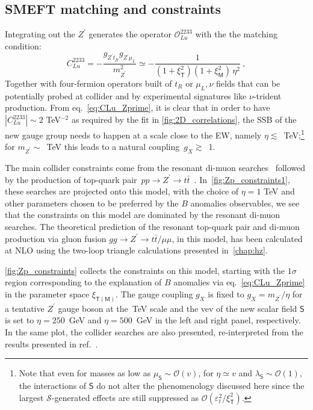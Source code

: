 \subsection{SMEFT matching and constraints}
\par Integrating out the $Z^{\prime}$ generates the operator $\mathcal O_{L u}^{2233}$ with the the matching condition:
\begin{equation}
	\label{eq:CLu_Zprime}
	C_{L u}^{2233} = - \frac{g_{Z^{\prime} t_{R} } g_{Z^{\prime} \mu_{L}} }{m_{Z^{\prime}}^2} \simeq - \frac{1}{(1+ \xi^2_{\mathsf{T}})(1+ \xi^2_{\mathsf{M}}) \, \eta^{2}} \ ,
\end{equation}
%
Together with four-fermion operators built of $t_{R}$ or $\mu_{L},\nu$  fields that can be potentially probed at collider and by experimental signatures like $\nu$-trident production.  From eq.~\eqref{eq:CLu_Zprime}, it is clear that in order to have $|C_{L u}^{2233}| \sim 2 $ TeV$^{-2}$ as required  by the fit in \autoref{fig:2D_correlations}, the SSB of the new gauge group needs to happen at a scale close to the EW, namely $\eta \lesssim$~TeV;\footnote{Note that even for masses as low as $\mu_{\mathsf{S}} \sim \mathcal{O}(v)$, for $\eta \simeq v$ and $\lambda_{\mathsf{S}} \sim \mathcal{O}(1)$, the interactions of $\mathsf{S}$ do not alter the phenomenology discussed here since the largest $\mathcal{S}$-generated effects are still suppressed as $\mathcal{O}(\varepsilon_{t}^2/\xi^2_{\mathsf{T}})$.} for $m_{Z^{\prime}} \sim$~TeV this leads to a natural coupling~$g_{X} \gtrsim$~1. 
\par The main collider constraints come from the resonant di-muon searches~\cite{ATLAS-CONF-2019-001} followed by the production of top-quark pair~$ pp \to Z^\prime \to t \bar t$~\cite{ATLAS:2019npw}. In~\autoref{fig:Zp_constraints1}, these searches are projected onto this model, with the choice of $\eta=1$ TeV and other parameters chosen to be preferred by the $B$ anomalies observables, we see that the constraints on this model are dominated by the resonant di-muon searches. The theoretical prediction of the resonant top-quark pair and di-muon production via gluon fusion $ gg \to Z^\prime \to t \bar t /\mu \mu$, in this model, has been calculated at NLO using the two-loop triangle calculations presented in~\autoref{chap:hz}. 
\par \autoref{fig:Zp_constraints} collects the constraints on this model, starting with the $1\sigma$ region corresponding to the explanation of $B$ anomalies via eq.~\eqref{eq:CLu_Zprime} in the parameter space $\xi_{\mathsf{T(M)}}$. The gauge coupling $g_X$ is fixed to $g_{X} = m_{Z^{\prime}}/\eta$ for a tentative $Z^{\prime}$ gauge boson at the~TeV scale and the vev of the new scalar field $\mathsf{S}$ is set to $\eta = 250$~GeV and $\eta = 500$~GeV  in the left and right panel, respectively. In the same plot, the collider searches are also presented, re-interpreted from the results presented in ref.~\cite{Camargo-Molina:2018cwu}. 
